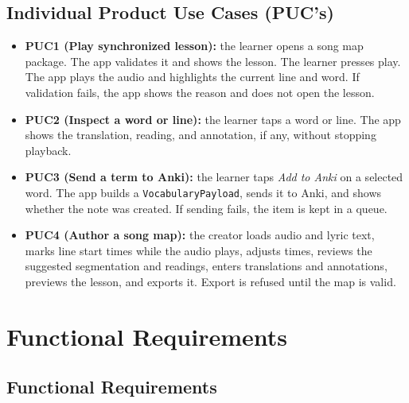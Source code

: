 \documentclass[12pt]{article}
\begin{document}
\subsection{Individual Product Use Cases (PUC's)} \label{SecPUC}
\begin{itemize}
    \item \textbf{PUC1 (Play synchronized lesson):} the learner opens a
          song map package. The app validates it and shows the lesson. The
          learner presses play. The app plays the audio and highlights the
          current line and word. If validation fails, the app shows the
          reason and does not open the lesson.
    \item \textbf{PUC2 (Inspect a word or line):} the learner taps a word or
          line. The app shows the translation, reading, and annotation, if
          any, without stopping playback.
    \item \textbf{PUC3 (Send a term to Anki):} the learner taps \emph{Add to
          Anki} on a selected word. The app builds a
          \texttt{VocabularyPayload}, sends it to Anki, and shows whether the
          note was created. If sending fails, the item is kept in a queue.
    \item \textbf{PUC4 (Author a song map):} the creator loads audio and
          lyric text, marks line start times while the audio plays, adjusts
          times, reviews the suggested segmentation and readings, enters
          translations and annotations, previews the lesson, and exports it.
          Export is refused until the map is valid.
\end{itemize}

\section{Functional Requirements}
\subsection{Functional Requirements} \label{SecFunctional}
\end{document}
